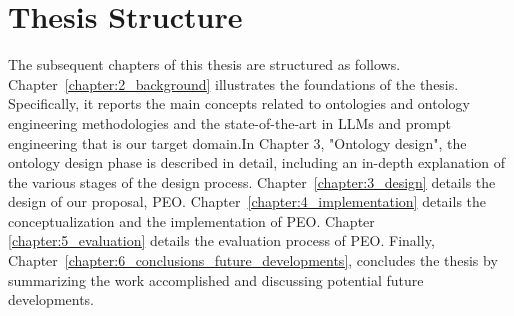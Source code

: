 \section{Thesis Structure}
The subsequent chapters of this thesis are structured as follows. 
Chapter~\ref{chapter:2_background} illustrates the foundations of the thesis.
Specifically, it reports the main concepts related to ontologies and ontology engineering methodologies and the state-of-the-art in LLMs and prompt engineering that is our target domain.In Chapter 3, "Ontology design", the ontology design phase is described in detail, including an in-depth explanation of the various stages of the design process. 
Chapter~\ref{chapter:3_design} details the design of our proposal, PEO. 
Chapter~\ref{chapter:4_implementation} details the conceptualization and the implementation of PEO. 
Chapter \ref{chapter:5_evaluation} details the evaluation process of PEO.
Finally, Chapter~\ref{chapter:6_conclusions_future_developments}, concludes the thesis by summarizing the work accomplished and discussing potential future developments.
